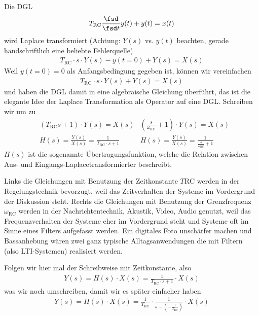 \begin{ExCalc}
Die DGL
\begin{align}
T_\mathrm{RC}\frac{\fsd}{\fsd t} y(t) + y(t) = x(t)\\
\end{align}
wird Laplace transformiert (Achtung: $Y(s)$ vs. $y(t)$ beachten,
gerade handschriftlich eine beliebte Fehlerquelle)
\begin{align}
T_\mathrm{RC} \cdot s \cdot Y(s) - y(t=0) + Y(s) = X(s)
\end{align}
Weil $y(t=0)=0$ als Anfangsbedingung gegeben ist, können wir vereinfachen
\begin{align}
T_\mathrm{RC} \cdot s \cdot Y(s) + Y(s) = X(s)
\end{align}
und haben die DGL damit in eine algebraische Gleichung überführt, das ist die
elegante Idee der Laplace Transformation als Operator auf eine DGL.
%
Schreiben wir um zu
\begin{align}
&(T_\mathrm{RC} s + 1 ) \cdot Y(s) = X(s)
& (\frac{s}{\omega_\mathrm{RC}} + 1 ) \cdot Y(s) = X(s) \\
&H(s) = \frac{Y(s)}{X(s)} = \frac{1}{T_\mathrm{RC} \cdot s + 1}
&H(s) = \frac{Y(s)}{X(s)} = \frac{1}{\frac{s}{\omega_\mathrm{RC}} + 1}
\end{align}
%
$H(s)$ ist die sogenannte Übertragungsfunktion, welche
die Relation zwischen Aus- und Eingangs-Laplacetransformierter beschreibt.

Links die Gleichungen mit Benutzung der Zeitkonstante $T\mathrm{RC}$ werden in der
Regelungstechnik bevorzugt, weil das Zeitverhalten der Systeme im Vordergrund
der Diskussion steht.
%
Rechts die Gleichungen mit Benutzung der Grenzfrequenz $\omega_\mathrm{RC}$ werden
in der Nachrichtentechnik, Akustik, Video, Audio genutzt, weil das Frequenzverhalten
der Systeme eher im Vordergrund steht und Systeme oft im Sinne eines Filters
aufgefasst werden. Ein digitales Foto unschärfer machen und Bassanhebung wären zwei ganz
typische Alltagsanwendungen die mit Filtern (also LTI-Systemen) realisiert werden.

Folgen wir hier mal der Schreibweise mit Zeitkonstante, also
\begin{align}
Y(s) = H(s) \cdot X(s) = \frac{1}{T_\mathrm{RC} \cdot s + 1} \cdot X(s)
\end{align}
was wir noch umschreiben, damit wir es später einfacher haben
\begin{align}
Y(s) = H(s) \cdot X(s) = \frac{1}{T_\mathrm{RC}} \cdot \frac{1}{s - (-\frac{1}{T_\mathrm{RC}})} \cdot X(s)
\end{align}


\end{ExCalc}
